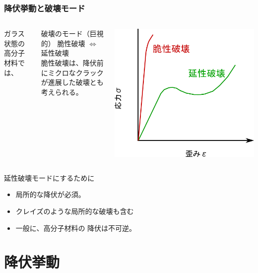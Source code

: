 \documentclass[10pt, dvipdfmx]{beamer}
\begin{document}
\begin{frame}
\frametitle{降伏挙動と破壊モード}
\begin{columns}[totalwidth=1\textwidth]
ガラス状態の高分子材料では、
\begin{block}{破壊のモード（巨視的）}
脆性破壊 $\Leftrightarrow$ 延性破壊\\
脆性破壊は、降伏前にミクロなクラックが進展した破壊とも考えられる。
\end{block}
	\centering
	\includegraphics[width=.9\textwidth]{S_S_Curve_2.png}
\end{columns}
\begin{exampleblock}{延性破壊モードにするために}
	\begin{itemize}
		\item
		{\color{red} 局所的な降伏}が必須。
		\item
		クレイズのような局所的な破壊も含む
		\item 
		一般に、高分子材料の{\color{red} 降伏は不可逆}。
	\end{itemize}
\end{exampleblock}
\end{frame}


\section{降伏挙動}
\end{document}
